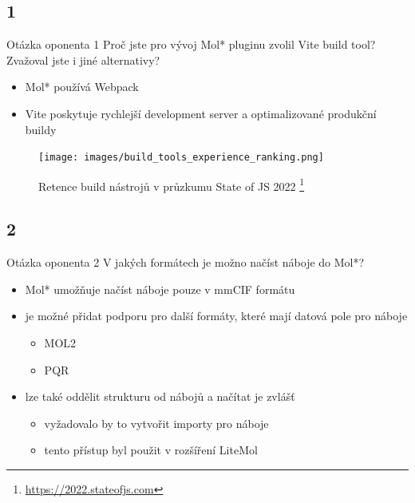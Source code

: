 \documentclass[
]{beamer}
\begin{document}
\subsection[1]{1}

\begin{frame}{}
  \begin{block}{Otázka oponenta 1}
    Proč jste pro vývoj Mol* pluginu zvolil Vite build tool? Zvažoval jste i jiné alternativy?
  \end{block}
  \begin{itemize}
    \item Mol* používá Webpack
    \item Vite poskytuje rychlejší development server a optimalizované produkční buildy
  \end{itemize}
\end{frame}

\begin{frame}
  \begin{figure}
    \texttt{[image: images/build\_tools\_experience\_ranking.png]}
    \caption{Retence build nástrojů v průzkumu State of JS 2022
      \footnote{\url{https://2022.stateofjs.com}}
    }
  \end{figure}
\end{frame}

\subsection[2]{2}

\begin{frame}
  \begin{block}{Otázka oponenta 2}
    V jakých formátech je možno načíst náboje do Mol*?
  \end{block}
  \begin{itemize}
    \item Mol* umožňuje načíst náboje pouze v mmCIF formátu
    \item je možné přidat podporu pro další formáty, které mají datová pole pro náboje
    \begin{itemize}
      \item MOL2
      \item PQR
    \end{itemize}
    \item lze také oddělit strukturu od nábojů a načítat je zvlášť
    \begin{itemize}
      \item vyžadovalo by to vytvořit importy pro náboje 
      \item tento přístup byl použit v rozšíření LiteMol
    \end{itemize}
  \end{itemize}
\end{frame}
\end{document}
